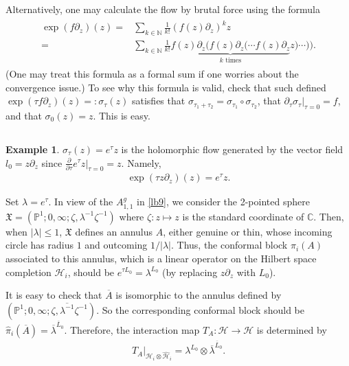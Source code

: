 \documentclass[11pt,b5paper,notitlepage]{article}
\theoremstyle{definition}
\newtheorem{eg}[df]{Example}
\theoremstyle{plain}
\newcommand{\fk}{\mathfrak}
\newcommand{\mc}{\mathcal}
\newcommand{\wht}{\widehat}
\newcommand{\ovl}{\overline}
\newcommand{\Cbb}{\mathbb C}
\newcommand{\Nbb}{\mathbb N}
\newcommand{\Pbb}{\mathbb P}
\numberwithin{equation}{section}
\begin{document}
Alternatively, one may calculate the flow by brutal force using the formula
\begin{align}\label{eq14}
\begin{aligned}
\exp(f\partial_z)(z)=&\sum_{k\in\Nbb}\frac 1{k!}(f(z)\partial_z)^kz\\
=&\sum_{k\in\Nbb}\frac 1{k!}\underbrace{f(z)\partial_z\Big(f(z)\partial_z\big(\cdots f(z)\partial_z}_{k\text{ times}} z)\cdots \big)\Big).
\end{aligned}
\end{align}
(One may treat this formula as a formal sum if one worries about the convergence issue.) To see why this formula is valid,  check that such defined $\exp(\tau f\partial_z)(z)=:\sigma_\tau(z)$ satisfies that $\sigma_{\tau_1+\tau_2}=\sigma_{\tau_1}\circ\sigma_{\tau_2}$, that $\partial_\tau\sigma_\tau|_{\tau=0}=f$, and that $\sigma_0(z)=z$. This is easy.



\subsection{}\label{lb10}

\begin{eg}\label{lb14}
$\sigma_\tau(z)=e^{\tau}z$ is the holomorphic flow generated by the vector field $l_0=z\partial_z$ since $\frac\partial{\partial\tau}e^\tau z|_{\tau=0}=z$. Namely,
\begin{align*}
\exp(\tau z\partial_z)(z)=e^\tau z.	
\end{align*}
\end{eg}



Set $\lambda=e^\tau$. In view of the  $A_{1,1}^g$ in \ref{lb9}, we consider the 2-pointed sphere $\fk X=(\Pbb^1;0,\infty;\zeta,\lambda^{-1}\zeta^{-1})$ where $\zeta:z\mapsto z$ is the standard coordinate of $\Cbb$. Then, when $|\lambda|\leq 1$, $\fk X$ defines an annulus $A$, either genuine or thin, whose incoming circle has radius $1$ and outcoming $1/|\lambda|$. Thus, the conformal block $\pi_i(A)$ associated to this annulus, which is a linear operator on the Hilbert space completion $\mc H_i$, should be $e^{\tau L_0}=\lambda^{L_0}$ (by replacing $z\partial_z$ with $L_0$). 

It is easy to check that $\ovl A$ is isomorphic to the annulus defined by $(\Pbb^1;0,\infty;\zeta,\ovl{\lambda^{-1}}\zeta^{-1})$. So the corresponding conformal block should be $\wht\pi_i(\ovl A)=\ovl\lambda^{\ovl L_0}$. Therefore, the interaction map $T_A:\mc H\rightarrow\mc H$ is determined by
\begin{align}
	T_A\big|_{\mc H_i\otimes\wht{\mc H}_i}=\lambda^{L_0}\otimes\ovl\lambda^{\ovl L_0}.	\label{eq9}
\end{align}
\end{document}
